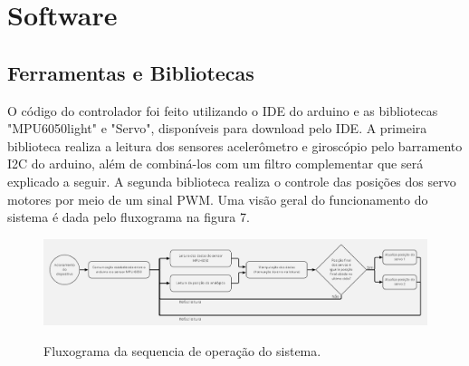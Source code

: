 
\chapter{Software}\label{cap:materialemetodos}

\section{Ferramentas e Bibliotecas}
O código do controlador foi feito utilizando o IDE do arduino e as bibliotecas "MPU6050\textunderscore light" e "Servo", disponíveis para download pelo IDE. A primeira biblioteca realiza a leitura dos sensores acelerômetro e giroscópio pelo barramento I2C do arduino, além de combiná-los com um filtro complementar que será explicado a seguir. A segunda biblioteca realiza o controle das posições dos servo motores por meio de um sinal PWM. Uma visão geral do funcionamento do sistema é dada pelo fluxograma na figura 7.

\begin{figure}[H]
\centering
\includegraphics[width=1\textwidth]{Capitulo3 - Software/Fluxograma.png}\\
\caption{\label{fig:widgets}Fluxograma da sequencia de operação do sistema.}
\end{figure}

